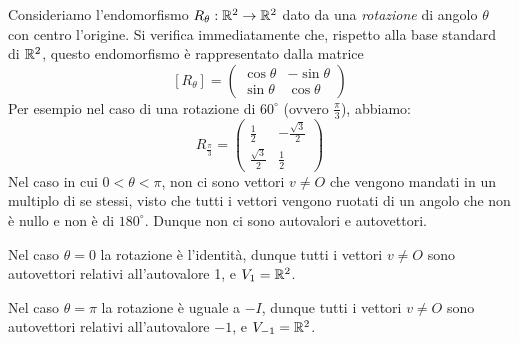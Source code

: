 \begin{example}
	Consideriamo l'endomorfismo $R_{\theta} : \mathbb{R}^2 \to \mathbb{R}^2$ dato
	da una \emph{rotazione} di angolo $\theta$ con centro l'origine. Si verifica
	immediatamente che, rispetto alla base standard di $\mathbb{R}^2$, questo
	endomorfismo è rappresentato dalla matrice
	\[
		[R_\theta] = \begin{pmatrix}
			\cos{\theta} & -\sin{\theta} \\
			\sin{\theta} & \cos{\theta}
		\end{pmatrix}
	\]
	Per esempio nel caso di una rotazione di $60^\circ$ (ovvero $\frac{\pi}{3}$),
	abbiamo:
	\[
		R_{\frac{\pi}{3}} = \begin{pmatrix}
			\frac{1}{2}        & -\frac{\sqrt{3}}{2} \\
			\frac{\sqrt{3}}{2} & \frac{1}{2}
		\end{pmatrix}
	\]
	Nel caso in cui $0 < \theta < \pi$, non ci sono vettori $v \neq O$ che vengono
	mandati in un multiplo di se stessi, visto che tutti i vettori vengono ruotati
	di un angolo che non è nullo e non è di $180^\circ$. Dunque non ci sono
	autovalori e autovettori.

	Nel caso $\theta = 0$ la rotazione è l'identità, dunque tutti i vettori
	$v \neq O$ sono autovettori relativi all'autovalore 1, e $V_1 = \mathbb{R}^2$.

	Nel caso $\theta = \pi$ la rotazione è uguale a $-I$, dunque tutti i vettori
	$v \neq O$ sono autovettori relativi all'autovalore $-1$, e
	$V_{-1} = \mathbb{R}^2$.
\end{example}
